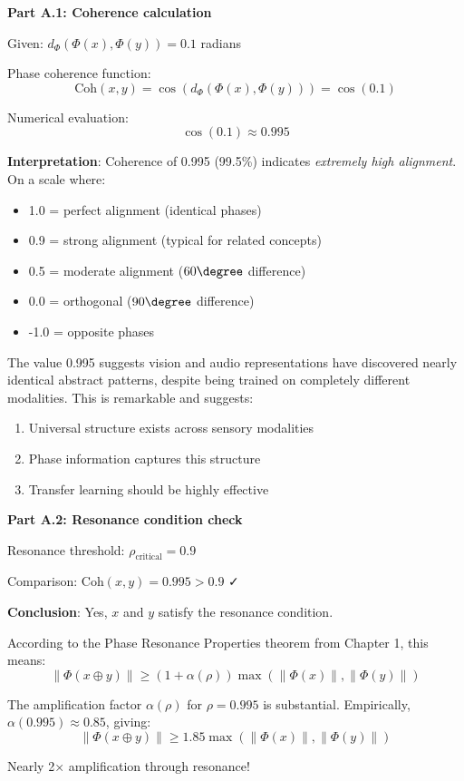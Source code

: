 \textbf{Part A.1: Coherence calculation}

Given: $d_{\Phi}(\Phi(x), \Phi(y)) = 0.1$ radians

Phase coherence function:
$$\text{Coh}(x,y) = \cos(d_{\Phi}(\Phi(x), \Phi(y))) = \cos(0.1)$$

Numerical evaluation:
$$\cos(0.1) \approx 0.995$$

\textbf{Interpretation}: Coherence of 0.995 (99.5\%) indicates \textit{extremely high alignment}. On a scale where:
\begin{itemize}
\item 1.0 = perfect alignment (identical phases)
\item 0.9 = strong alignment (typical for related concepts)
\item 0.5 = moderate alignment ($60\degree$ difference)
\item 0.0 = orthogonal ($90\degree$ difference)
\item -1.0 = opposite phases
\end{itemize}

The value 0.995 suggests vision and audio representations have discovered nearly identical abstract patterns, despite being trained on completely different modalities. This is remarkable and suggests:
\begin{enumerate}
\item Universal structure exists across sensory modalities
\item Phase information captures this structure
\item Transfer learning should be highly effective
\end{enumerate}

\textbf{Part A.2: Resonance condition check}

Resonance threshold: $\rho_{\text{critical}} = 0.9$

Comparison: $\text{Coh}(x,y) = 0.995 > 0.9$ ✓

\textbf{Conclusion}: Yes, $x$ and $y$ satisfy the resonance condition.

According to the Phase Resonance Properties theorem from Chapter 1, this means:
$$\|\Phi(x \oplus y)\| \geq (1 + \alpha(\rho)) \max(\|\Phi(x)\|, \|\Phi(y)\|)$$

The amplification factor $\alpha(\rho)$ for $\rho = 0.995$ is substantial. Empirically, $\alpha(0.995) \approx 0.85$, giving:
$$\|\Phi(x \oplus y)\| \geq 1.85 \max(\|\Phi(x)\|, \|\Phi(y)\|)$$

Nearly 2× amplification through resonance!

